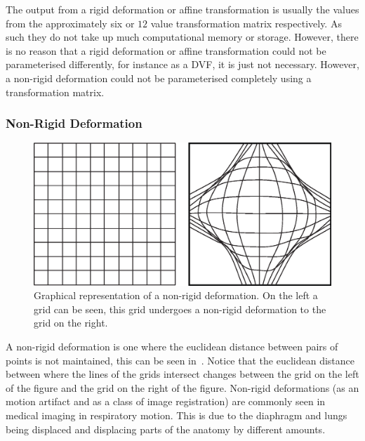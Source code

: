                 The output from a rigid deformation or affine transformation is usually the values from the approximately six or $12$ value transformation matrix respectively. As such they do not take up much computational memory or storage. However, there is no reason that a rigid deformation or affine transformation could not be parameterised differently, for instance as a \gls{DVF}, it is just not necessary. However, a non-rigid deformation could not be parameterised completely using a transformation matrix.
                
            \subsubsection{Non-Rigid Deformation} \label{sec:non_rigid_deformation}
                \begin{figure}
                    \centering
                    
                    \includegraphics[width=1.0\linewidth]{figures/background_nRD.png}
                    
                    \captionsetup{singlelinecheck=false}
                    \caption{
                        Graphical representation of a non-rigid deformation. On the left a grid can be seen, this grid undergoes a non-rigid deformation to the grid on the right.
                    }
                    \label{fig:non_rigid_deformation_nrd}
                \end{figure}
                
                A non-rigid deformation is one where the euclidean distance between pairs of points is not maintained, this can be seen in~. Notice that the euclidean distance between where the lines of the grids intersect changes between the grid on the left of the figure and the grid on the right of the figure. %
                Non-rigid deformations (as an motion artifact and as a class of image registration) are commonly seen in medical imaging in respiratory motion. This is due to the diaphragm and lungs being displaced and displacing parts of the anatomy by different amounts.
                
